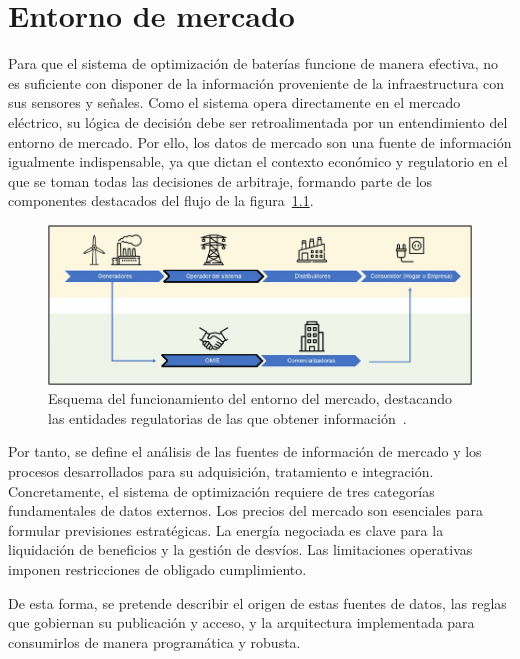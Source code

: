 \cleardoublepage

\chapter{Entorno de mercado}
\label{makereference4}

Para que el sistema de optimización de baterías funcione de manera efectiva, no es suficiente con disponer de la información proveniente de la infraestructura con sus sensores y señales. Como el sistema opera directamente en el mercado eléctrico, su lógica de decisión debe ser retroalimentada por un entendimiento del entorno de mercado. Por ello, los datos de mercado son una fuente de información igualmente indispensable, ya que dictan el contexto económico y regulatorio en el que se toman todas las decisiones de arbitraje, formando parte de los componentes destacados del flujo de la figura~\ref{fig:esquema-mercado}.

\begin{figure}
  \centering
  \includegraphics[width=0.75\linewidth]{figures/esquema-mercado.jpg}
  \caption[Esquema del funcionamiento del mercado.]{Esquema del funcionamiento del entorno del mercado, destacando las entidades regulatorias de las que obtener información~\cite{villagrasa2023como}.}
  \label{fig:esquema-mercado}
\end{figure}

Por tanto, se define el análisis de las fuentes de información de mercado y los procesos desarrollados para su adquisición, tratamiento e integración. Concretamente, el sistema de optimización requiere de tres categorías fundamentales de datos externos. Los precios del mercado son esenciales para formular previsiones estratégicas. La energía negociada es clave para la liquidación de beneficios y la gestión de desvíos. Las limitaciones operativas imponen restricciones de obligado cumplimiento.

De esta forma, se pretende describir el origen de estas fuentes de datos, las reglas que gobiernan su publicación y acceso, y la arquitectura implementada para consumirlos de manera programática y robusta.

